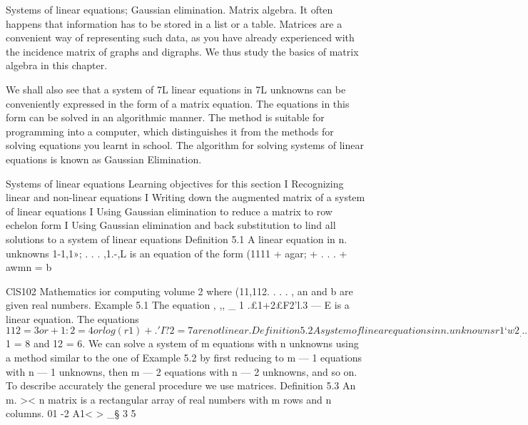 Systems of linear equations; Gaussian elimination. Matrix algebra.
It often happens that information has to be stored in a list or a table.
Matrices are a convenient way of representing such data, as you
have already experienced with the incidence matrix of graphs and
digraphs. We thus study the basics of matrix algebra in this chapter.



We shall also see that a system of 7L linear equations in 7L unknowns
can be conveniently expressed in the form of a matrix equation. The
equations in this form can be solved in an algorithmic manner. The
method is suitable for programming into a computer, which
distinguishes it from the methods for solving equations you learnt in
school. The algorithm for solving systems of linear equations is
known as Gaussian Elimination.



Systems of linear equations
Learning objectives for this section
I Recognizing linear and non-linear equations
I Writing down the augmented matrix of a system of linear equations
I Using Gaussian elimination to reduce a matrix to row echelon form
I Using Gaussian elimination and back substitution to lind all solutions to a system
of linear equations
Definition 5.1 A linear equation in n. unknowns 1-1,1»; . . . ,1.-,L is an
equation of the form
(1111 + agar; + . . . + awmn = b





ClS102 Mathematics ior computing volume 2
where (11,112. . . . , an and b are given real numbers.
Example 5.1 The equation
, ,, _ 1
.£1+2£F2’l.3 — E
is a linear equation.
The equations $112 = 3 or  + 1:2 = 4 or log(r1) + .'I?2 = 7 are not
linear.
Definition 5.2 A system of linear equations in n. unknowns
r1‘w2_ . . . ,1~,, is a collection of one or more linear equations involving
the same unknowns. A solutionfor this system is an assignment of
real numbers .11 : kl, ac; = k2, . . . ,;1c,,, = kn which satisfies each of the
equations in the system. To solve the system we want to find all the
solutions to the system.



Example 5.2 A system of linear equations and its solution
Consider the following system of two equations in two unknowns.
3.r1 + 612 = 60 (5.1)
211 — 1'2 = 10. (5.2)
Then %
001 + 2172 = Z0. (5.3)
Now Equation (5.2) — 2>< Equation (5.3) gives
—5.rZ = -30.
Therefore
.rg = 6.
Substituting back into Equation (5.3) gives
av1=2O—2av2 =20—12=8.
So the only solution to this system is $1 = 8 and 12 = 6.
We can solve a system of m equations with n unknowns using a
method similar to the one of Example 5.2 by ﬁrst reducing to m — 1
equations with n — 1 unknowns, then m — 2 equations with n — 2
unknowns, and so on. To describe accurately the general procedure
we use matrices.
Definition 5.3 An m. >< n matrix is a rectangular array of real numbers
with m rows and n columns.
01 -2
A1< >
_§ 3 5



